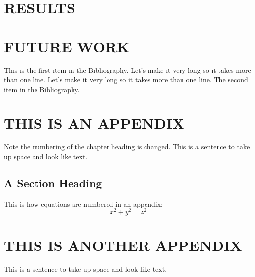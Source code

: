 \documentclass{thesis}
\begin{document}
\chapter{RESULTS}
\chapter{FUTURE WORK}

\begin{singlespace}
\begin{thebibliography}{99}
 This is the first item in the Bibliography.
Let's make it very long so it takes more than one line.
Let's make it very long so it takes more than one line.
 The second item in the Bibliography.
\end{thebibliography}
\end{singlespace}

\appendix    %
\chapter{THIS IS AN APPENDIX}
Note the numbering of the chapter heading is changed.
This is a sentence to take up space and look like text.
\section{A Section Heading}
This is how equations are numbered in an appendix:
\begin{equation}
x^2 + y^2 = z^2
\end{equation} 

\chapter{THIS IS ANOTHER APPENDIX}
This is a sentence to take up space and look like text.
\end{document}
